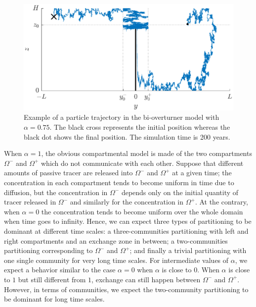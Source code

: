 \begin{figure}[!htp]
	\centering
	\includegraphics[width=\textwidth]{fig/problem2box/traj_with_transfer2.eps}
	\caption{Example of a particle trajectory in the bi-overturner model with $\alpha = 0.75$. The black cross represents the initial position whereas the black dot shows the final position. The simulation time is 200 years.}
	\label{fig:withtransfer}
\end{figure}
When $\alpha = 1$, the obvious compartmental model is made of the two compartments $\Omega^-$ and $\Omega^+$ which do not communicate with each other. Suppose that different amounts of passive tracer are released into $\Omega^-$ and $\Omega^+$ at a given time; the concentration in each compartment tends to become uniform in time due to diffusion, but the concentration in $\Omega^-$ depends only on the initial quantity of tracer released in $\Omega^-$ and similarly for the concentration in $\Omega^+$. At the contrary, when $\alpha = 0$ the concentration tends to become uniform over the whole domain when time goes to infinity. Hence, we can expect three types of partitioning to be dominant at different time scales: a three-communities partitioning with left and right compartments and an exchange zone in between; a two-communities partitioning corresponding to $\Omega^-$ and $\Omega^+$; and finally a trivial partitioning with one single community for very long time scales. For intermediate values of $\alpha$, we expect a behavior similar to the case $\alpha = 0$ when $\alpha$ is close to $0$. When $\alpha$ is close to $1$ but still different from $1$, exchange can still happen between $\Omega^-$ and $\Omega^+$. However, in terms of communities, we expect the two-community partitioning to be dominant for long time scales.  

